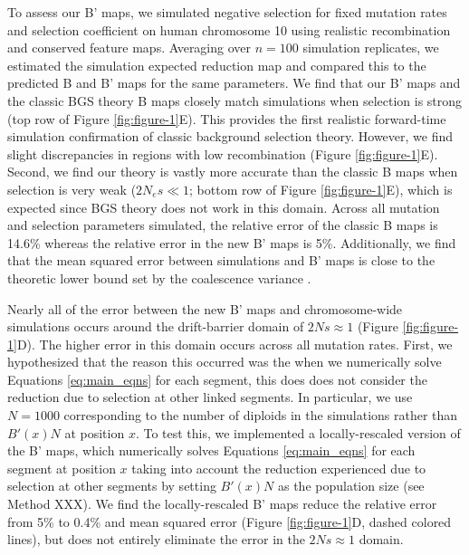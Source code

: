 \documentclass[11pt]{article}
\begin{document}
To assess our B' maps, we simulated negative selection for fixed mutation rates
and selection coefficient on human chromosome 10 using realistic recombination
and conserved feature maps. Averaging over $n=100$ simulation replicates, we
estimated the simulation expected reduction map and compared this to the
predicted B and B' maps for the same parameters. We find that our B' maps and
the classic BGS theory B maps closely match simulations when selection is
strong (top row of Figure \ref{fig:figure-1}E). This provides the first
realistic forward-time simulation confirmation of classic background selection
theory. However, we find slight discrepancies in regions with low recombination
(Figure \ref{fig:figure-1}E). Second, we find our theory is vastly more
accurate than the classic B maps when selection is very weak ($2N_e s \ll 1$;
bottom row of Figure \ref{fig:figure-1}E), which is expected since BGS theory
does not work in this domain. Across all mutation and selection parameters
simulated, the relative error of the classic B maps is 14.6\% whereas the
relative error in the new B' maps is 5\%. Additionally, we find that the mean
squared error between simulations and B' maps is close to the theoretic lower
bound set by the coalescence variance \parencite[see Methods
XXX]{Tajima1983-gu}.

Nearly all of the error between the new B' maps and chromosome-wide simulations
occurs around the drift-barrier domain of $2Ns \approx 1$ (Figure
\ref{fig:figure-1}D). The higher error in this domain occurs across all
mutation rates. First, we hypothesized that the reason this occurred was the
when we numerically solve Equations \eqref{eq:main_eqns} for each segment, this
does does not consider the reduction due to selection at other linked segments.
In particular, we use $N=1000$ corresponding to the number of diploids in the
simulations rather than $B'(x) N$ at position $x$. To test this, we implemented
a locally-rescaled version of the B' maps, which numerically solves Equations
\eqref{eq:main_eqns} for each segment at position $x$ taking into account the
reduction experienced due to selection at other segments by setting $B'(x)N$ as
the population size (see Method XXX). We find the locally-rescaled B' maps
reduce the relative error from 5\% to 0.4\% and mean squared error (Figure
\ref{fig:figure-1}D, dashed colored lines), but does not entirely eliminate the
error in the $2Ns \approx 1$ domain.
\end{document}
